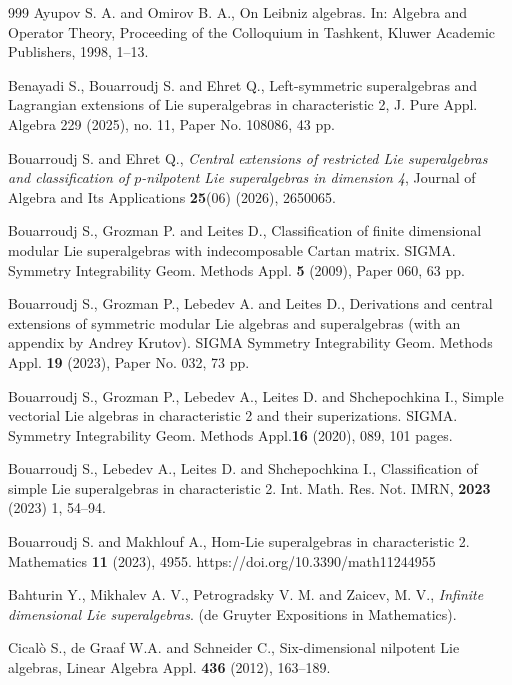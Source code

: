 \documentclass[12pt]{amsart}
\def\url#1{\expandafter\s

\tring\csname #1\endcsname}
\begin{document}
{\begin{thebibliography}{999}
 Ayupov S. A. and Omirov B. A., On Leibniz algebras. In: Algebra and Operator Theory, Proceeding of the Colloquium in Tashkent, Kluwer Academic Publishers, 1998, 1–13.

Benayadi S., Bouarroudj S. and Ehret Q., Left-symmetric superalgebras and Lagrangian extensions
of Lie superalgebras in characteristic 2, J. Pure Appl. Algebra 229 (2025), no. 11, Paper No. 108086,
43 pp.

Bouarroudj S. and Ehret Q., 
\emph{Central extensions of restricted Lie superalgebras and classification of $p$-nilpotent Lie superalgebras in dimension 4}, 
Journal of Algebra and Its Applications \textbf{25}(06) (2026), 2650065. 

        Bouarroudj S., Grozman P. and Leites D.,
        Classification of finite dimensional modular Lie
            superalgebras with indecomposable Cartan matrix. SIGMA. Symmetry Integrability Geom. Methods Appl. \textbf{5} (2009), Paper 060, 63 pp.

Bouarroudj S., Grozman P., Lebedev A. and Leites D.,
Derivations and central extensions of symmetric modular Lie algebras and superalgebras (with an appendix by Andrey Krutov).
SIGMA Symmetry Integrability Geom. Methods Appl. \textbf{19} (2023), Paper No. 032, 73 pp.

  Bouarroudj S., Grozman P., Lebedev A., Leites D. and Shchepochkina I., Simple vectorial
     Lie algebras in characteristic 2 and their superizations. SIGMA. Symmetry Integrability Geom. Methods Appl.\textbf{16} (2020), 089, 101 pages.

 Bouarroudj S., Lebedev A., Leites D. and Shchepochkina I., Classification of simple Lie superalgebras in characteristic 2. Int. Math. Res. Not. IMRN, \textbf{2023} (2023) 1, 54–94.

  Bouarroudj S. and  Makhlouf A.,
Hom-Lie superalgebras in characteristic 2. Mathematics
\textbf{11} (2023), 4955. https://doi.org/10.3390/math11244955

 Bahturin Y., Mikhalev A. V., Petrogradsky V. M. and Zaicev, M. V., {\it Infinite dimensional Lie superalgebras}. (de Gruyter Expositions in
Mathematics).

Cical\`{o} S., de Graaf W.A. and Schneider C.,
 Six-dimensional nilpotent Lie algebras, Linear Algebra Appl. \textbf{436} (2012), 163--189.


\end{thebibliography}}
\end{document}
